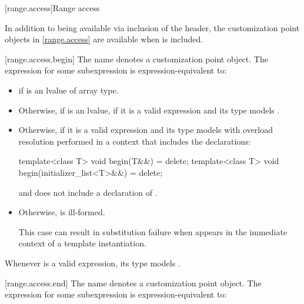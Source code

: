[range.access]{Range access}

\pnum
In addition to being available via inclusion of the 
header, the customization point objects in \ref{range.access} are
available when  is included.

[range.access.begin]{}
\pnum
The name  denotes a customization point
object. The expression
 for some subexpression  is
expression-equivalent to:

\begin{itemize}
\item
   if  is an lvalue of array type.

\item
  Otherwise, if  is an lvalue,
  if it is a valid expression and its type  models .

\item
  Otherwise,  if it is a
  valid expression and its type  models  with overload
  resolution performed in a context that includes the declarations:
  \begin{codeblock}
  template<class T> void begin(T&&) = delete;
  template<class T> void begin(initializer_list<T>&&) = delete;
  \end{codeblock}

  and does not include a declaration of .

\item
  Otherwise,  is ill-formed.
  \begin{note}
  This case can result in substitution failure when 
  appears in the immediate context of a template instantiation.
  \end{note}
\end{itemize}

\pnum
\begin{note}
Whenever  is a valid expression, its type models
.
\end{note}

[range.access.end]{}
\pnum
The name  denotes a customization point
object. The expression
 for some subexpression  is
expression-equivalent to:

